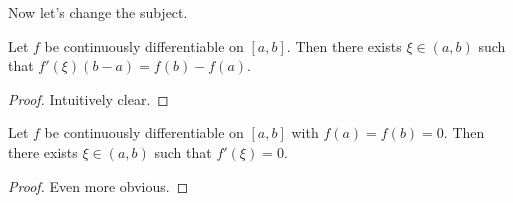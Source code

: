 Now let's change the subject.

\begin{thm}
Let $f$ be continuously differentiable on $[a,b]$. Then there
exists $\xi \in (a,b)$ such that $f'(\xi)(b-a)= f(b)-f(a)$.
\end{thm}

\begin{proof} Intuitively clear.
\end{proof}

\begin{cor}
Let $f$ be continuously differentiable on $[a,b]$ with
$f(a)=f(b)=0$. Then there exists $\xi \in (a,b)$ such that
$f'(\xi)=0$.
\end{cor}

\begin{proof} Even more obvious.
\end{proof}
